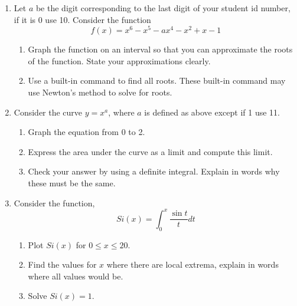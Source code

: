 \documentclass[11pt]{article}
\begin{document}
\begin{enumerate}
\item Let $a$ be the digit corresponding to the last digit of your student id number, if it is 0 use 10.  Consider the function 
\[f(x)=x^6-x^5- a x^4-x^2+x-1\]
\begin{enumerate}
\item Graph the function on an interval so that you can approximate the roots of the function.  State your approximations clearly.
\item Use a built-in command to find all roots.  These built-in command may use Newton's method to solve for roots.
\end{enumerate}




\item Consider the curve $y=x^a$, where $a$ is defined as above except if 1 use 11.

\begin{enumerate}
\item Graph the equation from 0 to 2. 
\item Express the area under the curve as a limit and compute this limit.
\item Check your answer by using a definite integral.  Explain in words why these must be the same.

\end{enumerate}
\item Consider the function, 
\[
Si(x)=\int_0^x\frac{\sin t}t dt
\]
\begin{enumerate}
\item Plot $Si(x)$ for $0\leq x\leq 20$.
\item Find the values for $x$ where there are local extrema, explain in words where all values would be.
\item Solve $Si(x)=1$.
\end{enumerate}
\end{enumerate}
\end{document}
